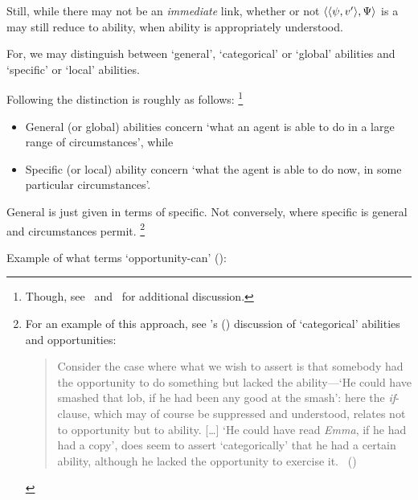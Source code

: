 \begin{note}
  Still, while there may not be an \emph{immediate} link, whether or not \(\langle \langle \psi, v' \rangle, \Psi \rangle\) is a \fc{} may still reduce to ability, when ability is appropriately understood.

  \nocite{Maier:2018uo}
  For, we may distinguish between `general', `categorical' or `global' abilities and `specific' or `local' abilities.

  Following \textcite[2]{Whittle:2010wr} the distinction is roughly as follows:%
  \footnote{
    Though, see~\textcite[esp.\ \S4]{Kittle:2015tb} and~\textcite[1--2]{Kikkert:2022wp} for additional discussion.%
  }
  \begin{itemize}[noitemsep]
  \item
    General (or global) abilities concern `what an agent is able to do in a large range of circumstances', while
  \item
    Specific (or local) ability concern `what the agent is able to do now, in some particular circumstances'.
  \end{itemize}

  General is just given in terms of specific.
  Not conversely, where specific is general and circumstances permit.%
  \footnote{
    For an example of this approach, see \citeauthor{Austin:1961vz}'s (\citeyear{Austin:1961vz}) discussion of `categorical' abilities and opportunities:

    \begin{quote}
      Consider the case where what we wish to assert is that somebody had the opportunity to do something but lacked the ability---`He could have smashed that lob, if he had been any good at the smash':
      here the \emph{if}-clause, which may of course be suppressed and understood, relates not to opportunity but to ability.
      [\dots]
      `He could have read \emph{Emma}, if he had had a copy', does seem to assert `categorically' that he had a certain ability, although he lacked the opportunity to exercise it.%
      \mbox{ }\hfill\mbox{(\citeyear[177]{Austin:1961vz})}
    \end{quote}
  }

  Example of what \textcite{Hackl:1998tt} terms `opportunity-can' (\citeyear[14]{Hackl:1998tt}):


\end{note}
